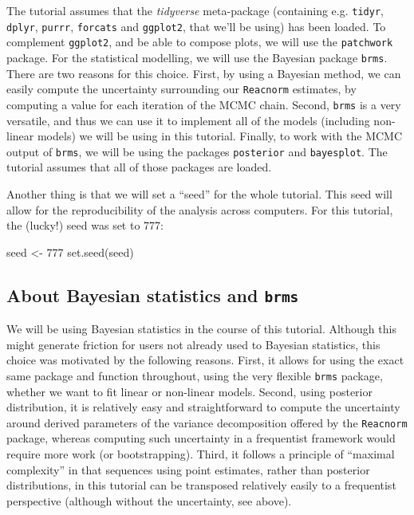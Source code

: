 \documentclass[a4paper,12pt,twoside]{article}
\begin{document}
The tutorial assumes that the \textit{tidyverse} meta-package (containing e.g. \texttt{tidyr}, \texttt{dplyr}, \texttt{purrr}, \texttt{forcats} and \texttt{ggplot2}, that we'll be using) has been loaded.
To complement \texttt{ggplot2}, and be able to compose plots, we will use the \texttt{patchwork} package. For the statistical modelling, we will use the Bayesian package \texttt{brms}. 
There are two reasons for this choice. First, by using a Bayesian method, we can easily compute the uncertainty surrounding our \texttt{Reacnorm} estimates, by computing a value for each iteration of the MCMC chain. Second, \texttt{brms} is a very versatile, and thus we can use it to implement all of the models (including non-linear models) we will be using in this tutorial.
Finally, to work with the MCMC output of \texttt{brms}, we will be using the packages \texttt{posterior} and \texttt{bayesplot}.
The tutorial assumes that all of those packages are loaded.

Another thing is that we will set a ``seed'' for the whole tutorial. This seed will allow for the reproducibility of the analysis across computers.
For this tutorial, the (lucky!) seed was set to 777:
\begin{Rinput}
seed <- 777
set.seed(seed)
\end{Rinput}

\subsection{About Bayesian statistics and \texttt{brms}}
\label{subsec_brms}

We will be using Bayesian statistics in the course of this tutorial. Although this might generate friction for users not already used to Bayesian statistics, this choice was motivated by the following reasons.
First, it allows for using the exact same package and function throughout, using the very flexible \texttt{brms} package, whether we want to fit linear or non-linear models.
Second, using posterior distribution, it is relatively easy and straightforward to compute the uncertainty around derived parameters of the variance decomposition offered by the \texttt{Reacnorm} package, whereas computing such uncertainty in a frequentist framework would require more work (or bootstrapping).
Third, it follows a principle of ``maximal complexity'' in that sequences using point estimates, rather than posterior distributions, in this tutorial can be transposed relatively easily to a frequentist perspective (although without the uncertainty, see above).
\end{document}
